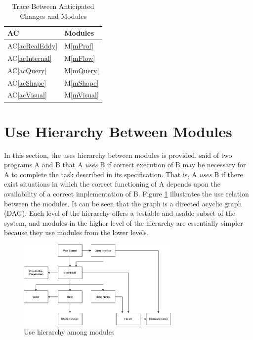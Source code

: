 \documentclass[12pt, titlepage]{article}
\newcommand{\acref}[1]{AC\ref{#1}}
\newcommand{\mref}[1]{M\ref{#1}}
\begin{document}
\begin{table}[H]
\centering
\begin{tabular}{p{} p{}}
\toprule
\textbf{AC} & \textbf{Modules}\\
\midrule
\acref{acRealEddy} & \mref{mProf}\\
\acref{acInternal} & \mref{mFlow}\\
\acref{acQuery} & \mref{mQuery}\\
\acref{acShape} & \mref{mShape}\\
\acref{acVisual} & \mref{mVisual}\\
\end{tabular}
\caption{Trace Between Anticipated Changes and Modules}
\label{TblACT}
\end{table}

\section{Use Hierarchy Between Modules} \label{SecUse}

In this section, the uses hierarchy between modules is
provided. \citet{Parnas1978} said of two programs A and B that A {\em uses} B if
correct execution of B may be necessary for A to complete the task described in
its specification. That is, A {\em uses} B if there exist situations in which
the correct functioning of A depends upon the availability of a correct
implementation of B.  Figure \ref{FigUH} illustrates the use relation between
the modules. It can be seen that the graph is a directed acyclic graph
(DAG). Each level of the hierarchy offers a testable and usable subset of the
system, and modules in the higher level of the hierarchy are essentially simpler
because they use modules from the lower levels.

\begin{figure}[H]
\centering
\includegraphics[width=0.7\textwidth]{UsesHierarchy.png}
\caption{Use hierarchy among modules}
\label{FigUH}
\end{figure}
\end{document}
